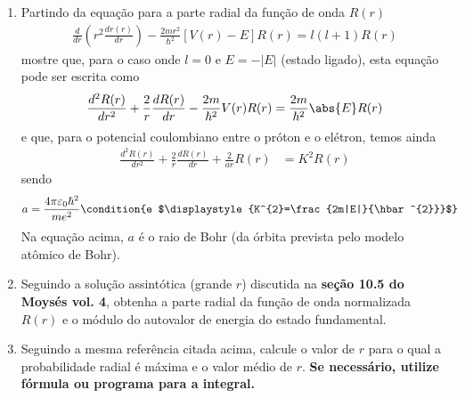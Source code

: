  \begin{prob}
	 \begin{enumerate}[label=\alph *)]
		 \item Partindo da equação para a parte radial da função de onda $R(r)$
			 \begin{align}
				 \label{eq:p3-eqRadialHidrogenio}
				 \frac{d}{dr}\left(r^{2}\frac{dr(r)}{dr}\right)-\frac{2mr^{2}}{\hbar^{2}}\left[V(r)-E\right]R(r)=l (l+1)R(r)
			 \end{align}
			 mostre que, para o caso onde $l=0$ e $E=-|E|$ (estado ligado), esta equação pode ser escrita como 
			 \begin{align}
				 \label{eq:p3-prSimplif}
				 \frac{d^{2}R(r)}{dr^{2}}+\frac{2}{r}\frac{dR(r)}{dr}-\frac{2m}{\hbar^{2}}V(r)R(r) = \frac{2m}{\hbar^{2}}\abs{E}R(r)
			 \end{align}
			 e que, para o potencial coulombiano entre o próton e o elétron, temos ainda
			 \begin{align}
				 \label{eq:p3-segSimplif}
				 \frac{d^{2}R(r)}{dr^{2}}+\frac{2}{r}\frac{dR(r)}{dr}+\frac{2}{ar}R(r) &= K^{2}R(r)
			 \end{align}
			 sendo
			 \begin{align}
				 \label{eq:p3-paramsRbohr}
				 a &= \frac{4 \pi \varepsilon_{0} \hbar^{2}}{me^{2}}\condition{e $\displaystyle{K^{2}=\frac{2m|E|}{\hbar^{2}}}$}
			 \end{align}
			 Na equação acima, $a$ é o raio de Bohr (da órbita prevista pelo modelo atômico de Bohr).
		 \item Seguindo a solução assintótica (grande $r$) discutida na \textbf{seção 10.5 do Moysés vol. 4}, obtenha a parte radial da função de onda normalizada $R(r)$ e o módulo do autovalor de energia do estado fundamental.
		 \item Seguindo a mesma referência citada acima, calcule o valor de $r$ para o qual a probabilidade radial é máxima e o valor médio de $r$. \textbf{Se necessário, utilize fórmula ou programa para a integral.}
	 \end{enumerate}


\end{prob}
